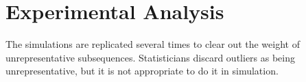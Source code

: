 \section{Experimental Analysis}
\label{sec:experimental-analysis}

The simulations are replicated several times to clear out the weight of unrepresentative subsequences.
Statisticians discard outliers as being unrepresentative, but it is not appropriate to do it in simulation.